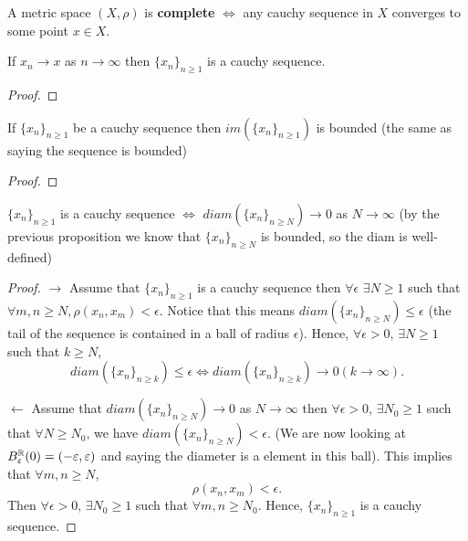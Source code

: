 \documentclass[a4paper]{article}
\begin{document}
\begin{definition}
  A metric space $\left( X,\rho \right)  $ is \textbf{complete} $\iff$ any cauchy sequence in  $X$ converges to some point  $x \in X$.  
\end{definition}

\begin{prop}
  If $x_n \to x$ as  $n \to \infty$  then $\{x_n\}_{n \geq 1} $ is a cauchy sequence.

  \begin{proof}
    
  \end{proof}
\end{prop}

\begin{prop}
 If $\{x_{n}\}_{n \geq 1}$ be a cauchy sequence then $im(\{x_n\}_{n \geq 1})$ is bounded (the same as saying the sequence is bounded) 
 \begin{proof}
   
 \end{proof}
\end{prop}

\begin{prop}
  $\{x_n\}_{n \geq 1} $ is a cauchy sequence $\iff$ $diam\left( \{x_n\}_{n \geq N}  \right) \to 0$ as $N \to \infty$ (by the previous proposition we know that $\{x_n\}_{n \geq N} $ is bounded, so the diam is well-defined)  

  \begin{proof}
    $\to$ Assume that  $\{x_n\}_{n \geq 1} $ is a cauchy sequence then $\forall \epsilon$  $\exists N \geq 1$ such that $\forall m,n \geq N, \rho(x_n,x_m) < \epsilon$. Notice that this means $diam(\{x_n\}_{n \geq N}) \leq \epsilon$ (the tail of the sequence is contained in a ball of radius $\epsilon$). Hence,  $\forall \epsilon > 0$,  $\exists  N \geq 1$ such that $k \geq N$,
    \[
    diam\left( \{x_n\}_{n \geq k}  \right) \leq \epsilon \iff diam\left( \{x_n\}_{n \geq k}  \right) \to 0 (k \to \infty) 
    .\] 

    $\leftarrow$ Assume that $diam\left( \{x_n\}_{n \geq N}  \right) \to 0$ as $N \to \infty$ then $\forall \epsilon > 0$, $\exists N_0 \geq 1$ such that $\forall N \geq N_0$, we have  $diam(\{x_n\}_{n \geq N}) < \epsilon $. (We are now looking at $B_\varepsilon^{\mathbb{R}}(0) = (-\varepsilon, \varepsilon)$ and saying the diameter is a element in this ball). This implies that $\forall m,n \geq N$, 
    \[
    \rho(x_n, x_m) < \epsilon
    .\] 
    Then $\forall \epsilon > 0$,  $\exists N_0 \geq 1$ such that $\forall m,n \geq N_0$. Hence, $\{x_n\}_{n \geq 1} $ is a cauchy sequence.   
  \end{proof}
\end{prop}
\end{document}
